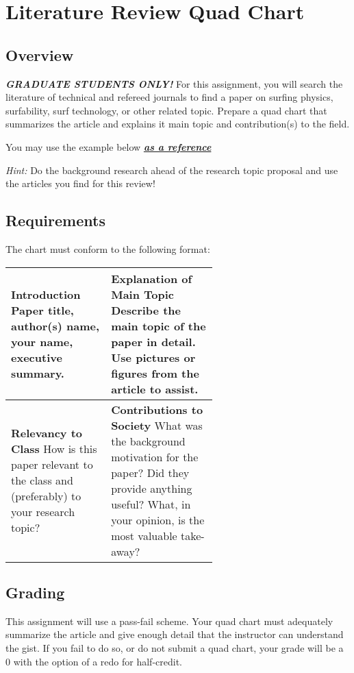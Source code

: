 \documentclass[
	letterpaper, %
	fontsize=10pt, %
	twoside=true, %
	numbers=noenddot, %
]{kaobook}
\begin{document}

\chapter*{Literature Review Quad Chart}

\section*{Overview}
\textbf{\emph{GRADUATE STUDENTS ONLY!}} For this assignment, you will search the literature of technical and refereed journals to find a paper on surfing physics, surfability, surf technology, or other related topic.
Prepare a quad chart that summarizes the article and explains it main topic and contribution(s) to the field. 

You may use the example below \underline{\textbf{\emph{as a reference}}}

\emph{Hint:} Do the background research ahead of the research topic proposal and use the articles you find for this review!

\section*{Requirements}
The chart must conform to the following format:

\vspace{0.5cm}

{
\setlength\extrarowheight{4pt}
\begin{table}[h!]
	\label{tab:quad_chart format}
	\begin{tabular}{| p{0.3\linewidth} | p{0.3\linewidth} |}
		\hline
		\textbf{Introduction} \newline Paper title, author(s) name, your name, executive summary. & 
		\textbf{Explanation of Main Topic} \newline Describe the main topic of the paper in detail. Use pictures or figures from the article to assist. \\
		\hline
		\textbf{Relevancy to Class} \newline How is this paper relevant to the class and (preferably) to your research topic? &
		\textbf{Contributions to Society} \newline What was the background motivation for the paper? Did they provide anything useful? What, in your opinion, is the most valuable take-away? \\
		\hline
	\end{tabular}
\end{table}
}

\section*{Grading}
This assignment will use a pass-fail scheme.
Your quad chart must adequately summarize the article and give enough detail that the instructor can understand the gist.
If you fail to do so, or do not submit a quad chart, your grade will be a 0 with the option of a redo for half-credit.


\end{document}
